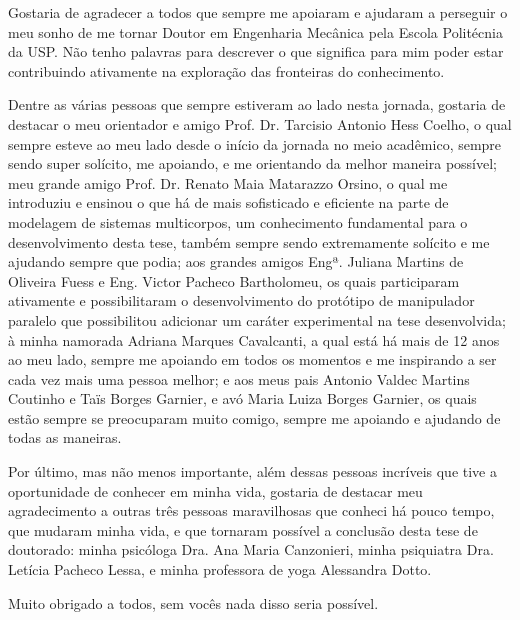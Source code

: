 \documentclass[]{politex}
\begin{document}
\begin{agradecimentos}

Gostaria de agradecer a todos que sempre me apoiaram e ajudaram a perseguir o meu sonho de me tornar Doutor em Engenharia Mecânica pela Escola Politécnia da USP. Não tenho palavras para descrever o que significa para mim poder estar contribuindo ativamente na exploração das fronteiras do conhecimento.

Dentre as várias pessoas que sempre estiveram ao lado nesta jornada, gostaria de destacar o meu orientador e amigo Prof. Dr. Tarcisio Antonio Hess Coelho, o qual sempre esteve ao meu lado desde o início da jornada no meio acadêmico, sempre sendo super solícito, me apoiando, e me orientando da melhor maneira possível; meu grande amigo Prof. Dr. Renato Maia Matarazzo Orsino, o qual me introduziu e ensinou o que há de mais sofisticado e eficiente na parte de modelagem de sistemas multicorpos, um conhecimento fundamental para o desenvolvimento desta tese, também sempre sendo extremamente solícito e me ajudando sempre que podia; aos grandes amigos Engª. Juliana Martins de Oliveira Fuess e Eng. Victor Pacheco Bartholomeu, os quais participaram ativamente e possibilitaram o desenvolvimento do protótipo de manipulador paralelo que possibilitou adicionar um caráter experimental na tese desenvolvida; à minha namorada Adriana Marques Cavalcanti, a qual está há mais de 12 anos ao meu lado, sempre me apoiando em todos os momentos e me inspirando a ser cada vez mais uma pessoa melhor; e aos meus pais Antonio Valdec Martins Coutinho e Taïs Borges Garnier, e avó Maria Luiza Borges Garnier, os quais estão sempre se preocuparam muito comigo, sempre me apoiando e ajudando de todas as maneiras.

Por último, mas não menos importante, além dessas pessoas incríveis que tive a oportunidade de conhecer em minha vida, gostaria de destacar meu agradecimento a outras três pessoas maravilhosas que conheci há pouco tempo, que mudaram minha vida, e que tornaram possível a conclusão desta tese de doutorado: minha psicóloga Dra. Ana Maria Canzonieri, minha psiquiatra Dra. Letícia Pacheco Lessa, e minha professora de yoga Alessandra Dotto.

Muito obrigado a todos, sem vocês nada disso seria possível.

\end{agradecimentos}
\end{document}
